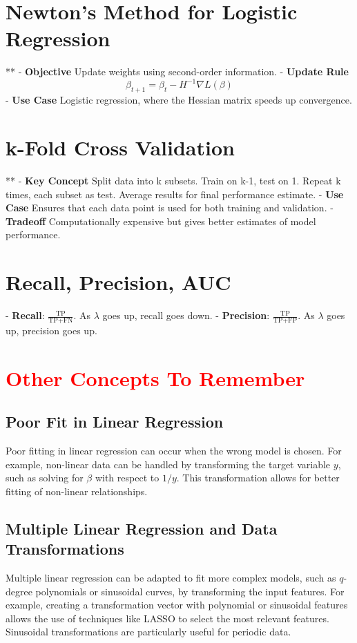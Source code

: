 \documentclass[10pt]{article}
\begin{document}
\begin{multicols}{2}
\section*{Newton's Method for Logistic Regression}**
- \textbf{Objective} Update weights using second-order information.
- \textbf{Update Rule} 
  \[
  \beta_{t+1} = \beta_t - H^{-1} \nabla L(\beta)
  \]
- \textbf{Use Case} Logistic regression, where the Hessian matrix speeds up convergence.

\section*{k-Fold Cross Validation}**
- \textbf{Key Concept} Split data into k subsets. Train on k-1, test on 1. Repeat k times, each subset as test. Average results for final performance estimate.
- \textbf{Use Case} Ensures that each data point is used for both training and validation.
- \textbf{Tradeoff} Computationally expensive but gives better estimates of model performance.


\section*{Recall, Precision, AUC}
- \textbf{Recall}: $\frac{\text{TP}}{\text{TP} + \text{FN}}$. As $\lambda$ goes up, recall goes down.
- \textbf{Precision}: $\frac{\text{TP}}{\text{TP} + \text{FP}}$. As $\lambda$ goes up, precision goes up.

\section*{\textcolor{red}{Other Concepts To Remember}}

\subsection*{Poor Fit in Linear Regression}
Poor fitting in linear regression can occur when the wrong model is chosen. For example, non-linear data can be handled by transforming the target variable \( y \), such as solving for \( \beta \) with respect to \( 1/y \). This transformation allows for better fitting of non-linear relationships.

\subsection*{Multiple Linear Regression and Data Transformations}
Multiple linear regression can be adapted to fit more complex models, such as \( q \)-degree polynomials or sinusoidal curves, by transforming the input features. For example, creating a transformation vector with polynomial or sinusoidal features allows the use of techniques like LASSO to select the most relevant features. Sinusoidal transformations are particularly useful for periodic data.


\end{multicols}
\end{document}
